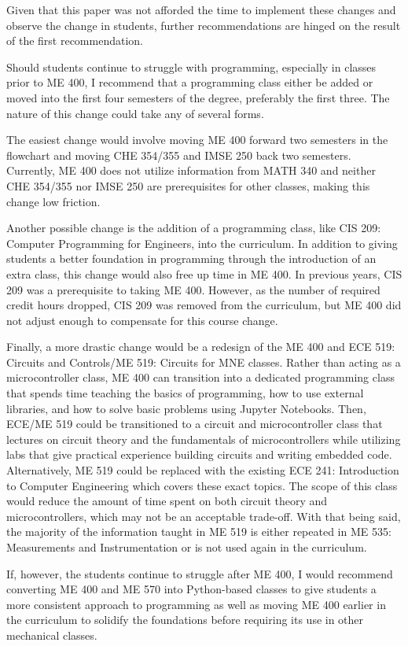 Given that this paper was not afforded the time to implement these changes
and observe the change in students, further recommendations are hinged on the
result of the first recommendation.

Should students continue to struggle with programming, especially in
classes prior to ME 400, I recommend that a programming class either be 
added or moved into the first four semesters of the degree, preferably 
the first three. The nature of this change could take any of several forms. 

The easiest change would involve moving ME 400 forward two semesters in the
flowchart and moving CHE 354/355 and IMSE 250 back two semesters. Currently,
ME 400 does not utilize information from MATH 340 and neither CHE 354/355 nor
IMSE 250 are prerequisites for other classes, making this change low friction. 

Another possible change is the addition of a programming class, like CIS 209: 
Computer Programming for Engineers, into the curriculum. In addition to 
giving students a better foundation in programming through the introduction
of an extra class, this change would also free up time in ME 400. In previous
years, CIS 209 was a prerequisite to taking ME 400. However, as the number
of required credit hours dropped, CIS 209 was removed from the curriculum,
but ME 400 did not adjust enough to compensate for this course change.

Finally, a more drastic change would be a redesign of the ME 400 and 
ECE 519: Circuits and Controls/ME 519: Circuits for MNE classes. Rather
than acting as a microcontroller class, ME 400 can transition into a dedicated
programming class that spends time teaching the basics of programming, how
to use external libraries, and how to solve basic problems using Jupyter
Notebooks. Then, ECE/ME 519 could be transitioned to a circuit and 
microcontroller class that lectures on circuit theory and the fundamentals
of microcontrollers while utilizing labs that give practical experience building
circuits and writing embedded code. Alternatively, ME 519 could be replaced 
with the existing ECE 241: Introduction to Computer Engineering which covers 
these exact topics. The scope of this class would reduce
the amount of time spent on both circuit theory and microcontrollers, which
may not be an acceptable trade-off. With that being said, the majority
of the information taught in ME 519 is either repeated in ME 535:
Measurements and Instrumentation or is not used again in the curriculum.

If, however, the students continue to struggle after ME 400, I would 
recommend converting ME 400 and ME 570 into Python-based classes to give
students a more consistent approach to programming as well as moving 
ME 400 earlier in the curriculum to solidify the foundations before 
requiring its use in other mechanical classes.
